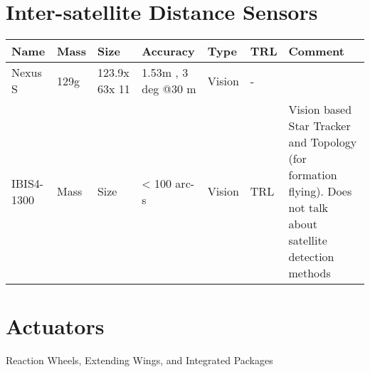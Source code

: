 \section{Inter-satellite Distance Sensors}


\begin{center}
     \begin{tabular}{ |p{2cm} | l | l | l | l | l | p{5cm} |}
     \hline

      {\bf Name} & {\bf Mass} & {\bf Size} & {\bf Accuracy} & {\bf Type} & {\bf TRL} & {\bf Comment}  \\ \hline

     Nexus S \cite{Ref:ids2} & 129g & 123.9x 63x 11 & 1.53m , 3 deg @30 m & Vision & -  &   \\ \hline

     IBIS4-1300 \cite{Ref:ids1} & Mass & Size & < 100 arc-s & Vision & TRL & Vision based Star Tracker and Topology (for formation flying). Does not talk about satellite detection methods \\ \hline
     \end{tabular}
\end{center}


\section{Actuators}

Reaction Wheels, Extending Wings, and Integrated Packages\\


